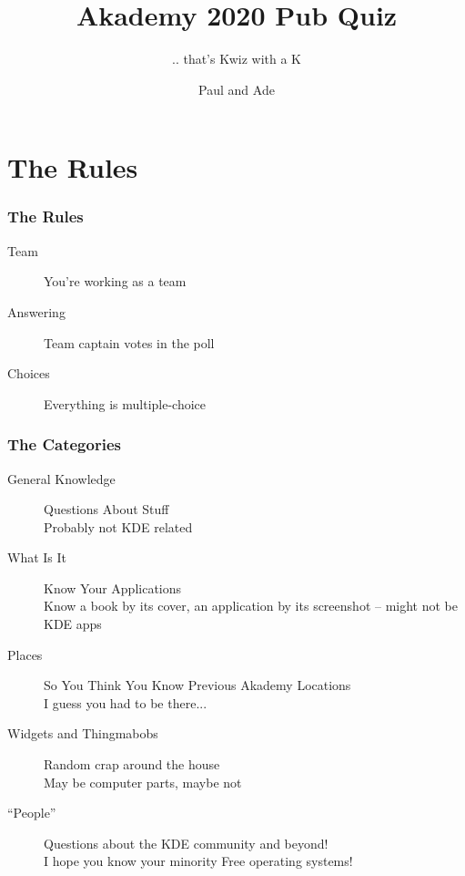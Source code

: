 \documentclass[t,compress,aspectratio=169]{beamer}
\title{Akademy 2020 Pub Quiz}
\subtitle{.. that's Kwiz with a K}
\author{Paul and Ade}
\begin{document}
\begin{withoutheadline}
\begin{frame}
\titlepage
\end{frame}
\end{withoutheadline}

\section*{The Rules}

\begin{frame}
    \frametitle{The Rules}
    \begin{description}
        \item[Team] You're working as a team
        \item[Answering] Team captain votes in the poll
        \item[Choices] Everything is multiple-choice
    \end{description}
\end{frame}

\begin{frame}
    \frametitle{The Categories}
    \begin{description}
        \item[General Knowledge] Questions About Stuff\\{\tiny{Probably not KDE related}}
        \item[What Is It] Know Your Applications\\{\tiny{Know a book by its cover, an application by its screenshot -- might not be KDE apps}}
        \item[Places] So You Think You Know Previous Akademy Locations\\{\tiny{I guess you had to be there...}}
        \item[Widgets and Thingmabobs] Random crap around the house\\{\tiny{May be computer parts, maybe not}}
        \item[``People''] Questions about the KDE community and beyond!\\{\tiny{I hope you know your minority Free operating systems!}}
    \end{description}
\end{frame}
\end{document}
